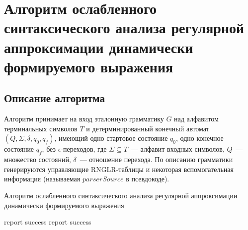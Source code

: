 \clearpage
\setmonofont[Mapping=tex-text]{CMU Typewriter Text}
\section{Алгоритм ослабленного синтаксического анализа регулярной аппроксимации динамически формируемого выражения}

\subsection{Описание алгоритма}
Алгоритм принимает на вход эталонную грамматику $G$ над алфавитом терминальных символов $T$ и детерминированный конечный автомат $(Q,\Sigma,\delta,q_0,q_f)$, имеющий одно стартовое состояние $q_0$, одно конечное состояние $q_f$, без $\epsilon$-переходов, где $\Sigma \subseteq T$~--- алфавит входных символов, $Q$~--- множество состояний, $\delta$~--- отношение перехода. По описанию  грамматики генерируются управляющие RNGLR-таблицы и некоторая вспомогательная информация (называемая $parserSource$ в псевдокоде).

\begin{algorithm}[!ht]
\begin{algorithmic}[1]
\caption{Алгоритм ослабленного синтаксического анализа регулярной аппроксимации динамически формируемого выражения}
\label{parsing}
     {report success}
    \EndIf
  \Else
    \EndWhile
     {report success}
    \EndIf
  \EndIf
\EndFunction
\end{algorithmic}
\end{algorithm}

